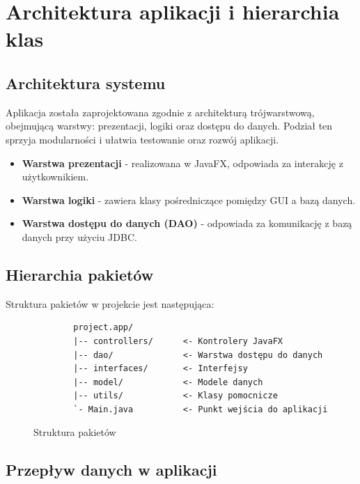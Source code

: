 \newpage
\section{Architektura aplikacji i hierarchia klas}
\label{sec:architekturaAplikacji}

\subsection{Architektura systemu}
\label{sec:architekturaSystemu}

Aplikacja została zaprojektowana zgodnie z architekturą trójwarstwową, obejmującą warstwy: prezentacji, logiki oraz dostępu do danych. Podział ten sprzyja modularności i ułatwia testowanie oraz rozwój aplikacji.

\begin{itemize}
    \item \textbf{Warstwa prezentacji} - realizowana w JavaFX, odpowiada za interakcję z użytkownikiem.
    \item \textbf{Warstwa logiki} - zawiera klasy pośredniczące pomiędzy GUI a bazą danych.
    \item \textbf{Warstwa dostępu do danych (DAO)} - odpowiada za komunikację z bazą danych przy użyciu JDBC.
\end{itemize}

\subsection{Hierarchia pakietów}

Struktura pakietów w projekcie jest następująca:

\begin{figure}[H]
    \label{strukturaKatalogow}
    \centering
    \begin{verbatim}
        project.app/
        |-- controllers/      <- Kontrolery JavaFX
        |-- dao/              <- Warstwa dostępu do danych
        |-- interfaces/       <- Interfejsy
        |-- model/            <- Modele danych
        |-- utils/            <- Klasy pomocnicze
        `- Main.java          <- Punkt wejścia do aplikacji
    \end{verbatim}
    \caption{Struktura pakietów}
\end{figure}

\subsection{Przepływ danych w aplikacji}

